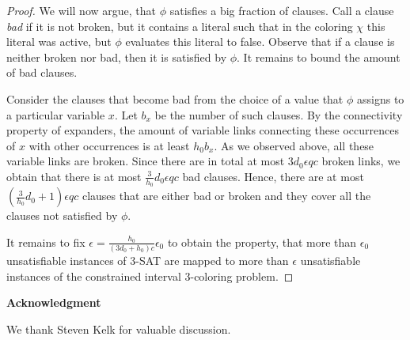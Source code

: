 \documentclass[a4paper,11pt]{article}
\theoremstyle{theorem}
\begin{document}
\begin{proof}
We will now argue, that $\phi$ satisfies a big fraction of clauses.
Call a clause \emph{bad} if it is not broken, but it contains a literal
such that in the coloring $\chi$ this literal was active, but $\phi$ evaluates
this literal to false. Observe that if a clause is neither broken nor bad, then
it is satisfied by $\phi$. It remains to bound the amount of bad clauses.

Consider the clauses that become bad from the choice of a value that $\phi$
assigns to a particular variable $x$. Let $b_x$ be the number of such clauses. 
By the connectivity property of expanders,
the amount of variable links connecting these occurrences of $x$ with other occurrences
is at least $h_0 b_x$. As we observed above, all these variable links are broken.
Since there are in total at most $3 d_0 \epsilon q c$ broken links, we obtain that 
there is at most $\tfrac{3}{h_0} d_0 \epsilon q c$ bad clauses. Hence, there are at most
$(\tfrac{3}{h_0} d_0 +1)\epsilon q c$ clauses that are either bad or broken and they cover
all the clauses not satisfied by $\phi$.

It remains to fix $\epsilon = \tfrac{h_0}{(3 d_0 + h_0)c} \epsilon_0$ to obtain the property,
that more than $\epsilon_0$ unsatisfiable instances of 3-SAT are mapped to more than
$\epsilon$ unsatisfiable instances of the constrained interval 3-coloring problem.
\end{proof}

\smallskip
\noindent
{\bf Acknowledgment}

\noindent
We thank Steven Kelk for valuable discussion. 



\end{document}
